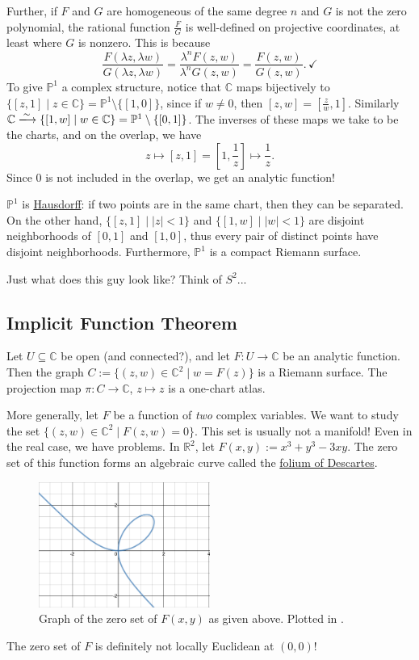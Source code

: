 \documentclass[12pt]{article}
\newcommand{\cx}{\mathbb{C}}
\newcommand{\real}{\mathbb{R}}
\newcommand{\p}{\mathbb{P}}
\newcommand{\ita}[1]{\textit{#1}}
\theoremstyle{definition}
\theoremstyle{remark}
\begin{document}
Further, if $F$ and $G$ are homogeneous of the same degree $n$ and $G$ is not the zero polynomial, the rational function $\frac{F}{G}$ is well-defined on projective coordinates, at least where $G$ is nonzero. This is because
\begin{equation}
    \frac{F(\lambda z,\lambda w)}{G(\lambda z,\lambda w)}=\frac{\lambda^n F(z,w)}{\lambda^n G(z,w)}=\frac{F(z,w)}{G(z,w)}.\,\checkmark
\end{equation}
To give $\p^1$ a complex structure, notice that $\cx$ maps bijectively to $\{[z,1]\mid z \in\cx\}=\p^1\setminus\{[1,0]\}$, since if $w\neq0$, then $[z,w]=\left[\frac{z}{w},1\right]$. Similarly $\cx\xlongrightarrow{\sim}\{[1,w]\mid w\in\cx\}=\p^1\setminus\{[0,1]\}$. The inverses of these maps we take to be the charts, and on the overlap, we have
\begin{equation}
    z\mapsto[z,1]=\left[1,\frac{1}{z}\right]\mapsto\frac{1}{z}.
\end{equation}
Since 0 is not included in the overlap, we get an analytic function!

$\p^1$ is \underline{Hausdorff}: if two points are in the same chart, then they can be separated. On the other hand, $\{[z,1]\mid|z|<1\}$ and $\{[1,w]\mid|w|<1\}$ are disjoint neighborhoods of $[0,1]$ and $[1,0]$, thus every pair of distinct points have disjoint neighborhoods. Furthermore, $\p^1$ is a compact Riemann surface.

Just what does this guy look like? Think of $S^2$...
\subsection{Implicit Function Theorem}
Let $U\subseteq\cx$ be open (and connected?), and let $F:U\to\cx$ be an analytic function. Then the graph $C:=\{(z,w)\in\cx^2\mid w=F(z)\}$ is a Riemann surface. The projection map $\pi:C\to\cx$, $z\mapsto z$ is a one-chart atlas.

More generally, let $F$ be a function of \ita{two} complex variables. We want to study the set $\{(z,w)\in\cx^2\mid F(z,w)=0\}$. This set is usually not a manifold! Even in the real case, we have problems. In $\real^2$, let $F(x,y):=x^3+y^3-3xy$. The zero set of this function forms an algebraic curve called the \underline{folium of Descartes}. 
\begin{figure}[H]
    \centering
    \includegraphics[width=0.5\textwidth]{3.png}
    \caption{Graph of the zero set of $F(x,y)$ as given above. Plotted in \cite{Desmos}.}
    \label{fig:Fig3}
\end{figure}
The zero set of $F$ is definitely not locally Euclidean at $(0,0)$!
\end{document}
